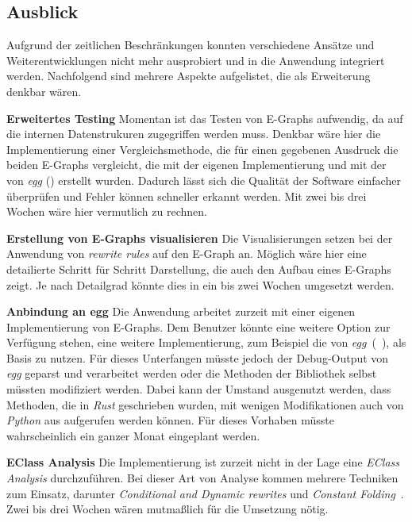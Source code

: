 \subsection{Ausblick}

Aufgrund der zeitlichen Beschränkungen konnten verschiedene Ansätze und Weiterentwicklungen nicht mehr ausprobiert und in die Anwendung integriert werden.
Nachfolgend sind mehrere Aspekte aufgelistet, die als Erweiterung denkbar wären. 

\textbf{Erweitertes Testing} Momentan ist das Testen von E-Graphs aufwendig, da auf die internen Datenstrukuren zugegriffen werden muss.
Denkbar wäre hier die Implementierung einer Vergleichsmethode, die für einen gegebenen Ausdruck die beiden E-Graphs vergleicht,
die mit der eigenen Implementierung und mit der von \textit{egg} (\cite{2021-egg}) erstellt wurden. 
Dadurch lässt sich die Qualität der Software einfacher überprüfen und Fehler können schneller erkannt werden.
Mit zwei bis drei Wochen wäre hier vermutlich zu rechnen.

\textbf{Erstellung von E-Graphs visualisieren} Die Visualisierungen setzen bei der Anwendung von \textit{rewrite rules} auf den E-Graph an.
Möglich wäre hier eine detailierte Schritt für Schritt Darstellung, die auch den Aufbau eines E-Graphs zeigt. 
Je nach Detailgrad könnte dies in ein bis zwei Wochen umgesetzt werden.

\textbf{Anbindung an egg} Die Anwendung arbeitet zurzeit mit einer eigenen Implementierung von E-Graphs. Dem Benutzer könnte eine weitere Option zur Verfügung stehen, eine weitere
Implementierung, zum Beispiel die von \textit{egg}~(~\cite{2021-egg}), als Basis zu nutzen.
Für dieses Unterfangen müsste jedoch der Debug-Output von \textit{egg} geparst und verarbeitet werden oder die Methoden der Bibliothek selbst müssten modifiziert werden.
Dabei kann der Umstand ausgenutzt werden, dass Methoden, die in \textit{Rust} geschrieben wurden, mit wenigen Modifikationen auch von \textit{Python} aus aufgerufen werden können.
Für dieses Vorhaben müsste wahrscheinlich ein ganzer Monat eingeplant werden.

\textbf{EClass Analysis}
Die Implementierung ist zurzeit nicht in der Lage eine \textit{EClass Analysis} durchzuführen. Bei dieser Art von Analyse kommen mehrere Techniken zum Einsatz, darunter
\textit{Conditional and Dynamic rewrites} und \textit{Constant Folding}~\cite{2021-egg}. Zwei bis drei Wochen wären mutmaßlich für die Umsetzung nötig.
